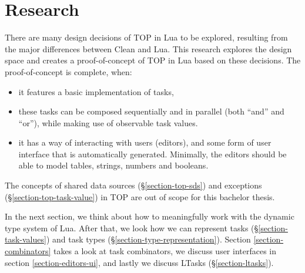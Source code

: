 \chapter{Research}\label{research}

There are many design decisions of TOP in Lua to be explored, resulting from the major differences between Clean and Lua. This research explores the design space and creates a proof-of-concept of TOP in Lua based on these decisions. The proof-of-concept is complete, when:
\begin{itemize}
    \item it features a basic implementation of tasks,
    \item these tasks can be composed sequentially and in parallel (both ``and'' and ``or''), while making use of observable task values.
    \item it has a way of interacting with users (editors), and some form of user interface that is automatically generated. Minimally, the editors should be able to model tables, strings, numbers and booleans.
\end{itemize}

The concepts of shared data sources (\S \ref{section-top-sds}) and exceptions (\S \ref{section-top-task-value}) in TOP are out of scope for this bachelor thesis.

In the next section, we think about how to meaningfully work with the dynamic type system of Lua. After that, we look how we can represent tasks (\S \ref{section-task-values}) and task types (\S \ref{section-type-representation}). Section \ref{section-combinators} takes a look at task combinators, we discuss user interfaces in section \ref{section-editors-ui}, and lastly we discuss LTasks (\S \ref{section-ltasks}).





\pagebreak



